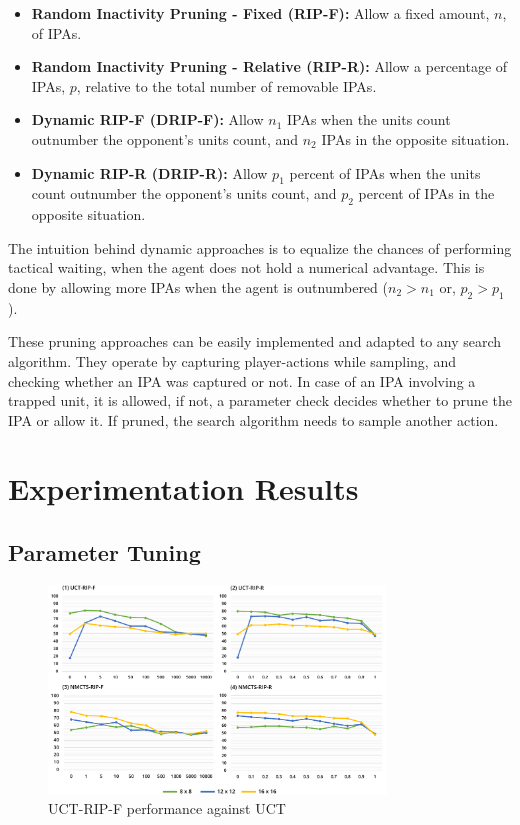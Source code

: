 \documentclass[conference]{IEEEtran}
\begin{document}
\begin{itemize}
\item \textbf{Random Inactivity Pruning - Fixed (RIP-F):} Allow a fixed amount, $n$, of IPAs.
\item \textbf{Random Inactivity Pruning - Relative (RIP-R):} Allow a percentage of IPAs, $p$, relative to the total number of removable IPAs.
\item \textbf{Dynamic RIP-F (DRIP-F):} Allow $n_1$ IPAs when the units count outnumber the opponent's units count, and $n_2$ IPAs in the opposite situation.
\item \textbf{Dynamic RIP-R (DRIP-R):} Allow $p_1$ percent of IPAs when the units count outnumber the opponent's units count, and $p_2$ percent of IPAs in the opposite situation.
\end{itemize}

The intuition behind dynamic approaches is to equalize the chances of performing tactical waiting, when the agent does not hold a numerical advantage. This is done by allowing more IPAs when the agent is outnumbered ($n_2 > n_1$ or, $p_2 > p_1$).

These pruning approaches can be easily implemented and adapted to any search algorithm. They operate by capturing player-actions while sampling, and checking whether an IPA was captured or not. In case of an IPA involving a trapped unit, it is allowed, if not, a parameter check decides whether to prune the IPA or allow it. If pruned, the search algorithm needs to sample another action.

\section{Experimentation Results}

\subsection{Parameter Tuning}


\begin{figure}[!h]
\begin{center}
	\includegraphics[width=0.8\textwidth]{figs/PT.pdf}
	\caption{UCT-RIP-F performance against UCT}
	\label{PT}
\end{center}
\end{figure}
\end{document}
